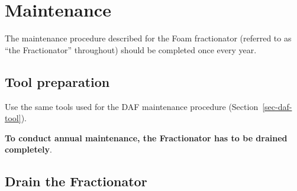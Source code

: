 \documentclass[
  letterpaper,
  DIV=11,
  numbers=noendperiod]{scrreprt}
\begin{document}
\hypertarget{sec-frac-main}{%
\section{Maintenance}\label{sec-frac-main}}

{The maintenance procedure described for the Foam fractionator (referred
to as ``the Fractionator'' throughout) should be completed once every
year}.

\hypertarget{tool-preparation-1}{%
\subsection{Tool preparation}\label{tool-preparation-1}}

Use the same tools used for the DAF maintenance procedure
(Section~\ref{sec-daf-tool}).

\textbf{To conduct annual maintenance, the Fractionator has to be
drained completely}.

\hypertarget{sec-drain-frac}{%
\subsection{Drain the Fractionator}\label{sec-drain-frac}}
\end{document}
